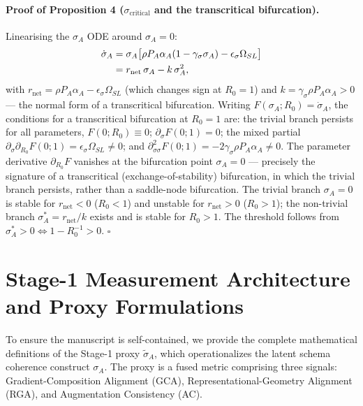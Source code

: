 \documentclass{article}
\theoremstyle{definition}
\begin{document}
\paragraph*{Proof of Proposition 4 ($\sigma_{\text{critical}}$ and the
transcritical bifurcation).}
Linearising the $\sigma_A$ ODE around $\sigma_A = 0$:
\begin{align}
\dot{\sigma}_A &= \sigma_A\bigl[\rho P_A\alpha_A(1-\gamma_\sigma\sigma_A) - \epsilon_\sigma\Omega_{SL}\bigr] \notag\\
&= r_{\text{net}}\,\sigma_A - k\,\sigma_A^2,
\label{eq:bif-normal-form}
\end{align}
with $r_{\text{net}} = \rho P_A \alpha_A - \epsilon_\sigma \Omega_{SL}$
(which changes sign at $R_0 = 1$) and $k = \gamma_\sigma \rho P_A
\alpha_A > 0$ --- the normal form of a transcritical bifurcation.
Writing $F(\sigma_A; R_0) = \dot{\sigma}_A$, the conditions for a
transcritical bifurcation at $R_0 = 1$ are: the trivial branch persists
for all parameters, $F(0; R_0) \equiv 0$; $\partial_\sigma F(0; 1) = 0$;
the mixed partial $\partial_\sigma \partial_{R_0} F(0; 1) =
\epsilon_\sigma \Omega_{SL} \neq 0$; and
$\partial^2_{\sigma\sigma} F(0; 1) = -2\gamma_\sigma \rho P_A \alpha_A
\neq 0$. The parameter derivative $\partial_{R_0} F$ vanishes at the
bifurcation point $\sigma_A = 0$ --- precisely the signature of a
transcritical (exchange-of-stability) bifurcation, in which the trivial
branch persists, rather than a saddle-node bifurcation. The trivial
branch $\sigma_A = 0$ is stable for $r_{\text{net}} < 0$ ($R_0 < 1$) and
unstable for $r_{\text{net}} > 0$ ($R_0 > 1$); the non-trivial branch
$\sigma_A^* = r_{\text{net}}/k$ exists and is stable for $R_0 > 1$. The
threshold follows from $\sigma_A^* > 0 \iff 1 - R_0^{-1} > 0$. $\square$

\section{Stage-1 Measurement Architecture and Proxy Formulations}
\label{app:stage1_proxy}

To ensure the manuscript is self-contained, we provide the complete mathematical definitions of the Stage-1 proxy $\tilde{\sigma}_A$, which operationalizes the latent schema coherence construct $\sigma_A$. The proxy is a fused metric comprising three signals: Gradient-Composition Alignment (GCA), Representational-Geometry Alignment (RGA), and Augmentation Consistency (AC).
\end{document}
